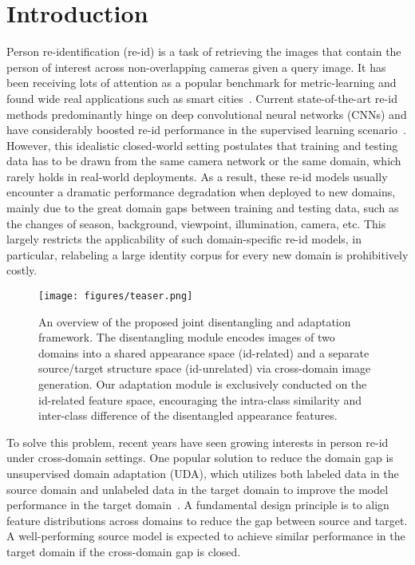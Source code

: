 \documentclass[runningheads]{llncs}
\begin{document}
\section{Introduction}
Person re-identification (re-id) is a task of retrieving the images that contain the person of interest across non-overlapping cameras given a query image.
It has been receiving lots of attention as a popular benchmark for metric-learning and found wide real applications such as smart cities~\cite{aicity20,pamtri,Tang_2019_CVPR,vehiclex}. Current state-of-the-art re-id methods predominantly hinge on deep convolutional neural networks (CNNs) and have considerably boosted re-id performance in the supervised learning scenario~\cite{sun2018beyond,attentive-siamese,zheng2019joint}. However, this idealistic closed-world setting postulates that training and testing data has to be drawn from the same camera network or the same domain, which rarely holds in real-world deployments. As a result, these re-id models usually encounter a dramatic performance degradation when deployed to new domains, mainly due to the great domain gaps between training and testing data, such as the changes of season, background, viewpoint, illumination, camera, etc. This largely restricts the applicability of such domain-specific re-id models, in particular, relabeling a large identity corpus for every new domain is prohibitively costly.



\begin{figure}[t]
	\centering
	\texttt{[image: figures/teaser.png]}
	\caption{An overview of the proposed joint disentangling and adaptation framework. The disentangling module encodes images of two domains into a shared appearance space (id-related) and a separate source/target structure space (id-unrelated) via cross-domain image generation. Our adaptation module is exclusively conducted on the id-related feature space, encouraging the intra-class similarity and inter-class difference of the disentangled appearance features.} 
	\vspace{-10pt}
	\label{fig:teaser}
\end{figure}

To solve this problem, recent years have seen growing interests in person re-id under cross-domain settings. One popular solution to reduce the domain gap is unsupervised domain adaptation (UDA), which utilizes both labeled data in the source domain and unlabeled data in the target domain to improve the model performance in the target domain~\cite{hoffman2018cycada,Zou_2019_ICCV}. A fundamental design principle is to align feature distributions across domains to reduce the gap between source and target. A well-performing source model is expected to achieve similar performance in the target domain if the cross-domain gap is closed.
\end{document}
